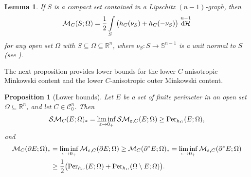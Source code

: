 \documentclass[pdflatex,sn-mathphys-num]{sn-jnl}
\theoremstyle{plain}
\newtheorem{proposition}[theorem]{Proposition}
\newtheorem{lemma}[theorem]{Lemma}
\theoremstyle{definition}
\DeclareMathOperator{\difm}{\textup{d$\mathcal{H}$}}
\begin{document}
\begin{lemma}\label{crucial}
    If $S$ is a compact set contained in a Lipschitz $(n-1)$-graph, then
    \[
        \mathcal{M}_{C}(S; \Omega)=\frac{1}{2}\int\limits_{S} \big(h_C(\nu_S)+h_C(-\nu_S)\big)\, \difm^{n-1}
    \]
    for any open set $\Omega$ with $S\subseteq\Omega\subseteq\mathbb{R}^n$, where $\nu_S\colon S\to\mathbb{S}^{n-1}$ is a unit normal to $S$ (see \cite[p. 3]{Villa2}). 
\end{lemma}
The next proposition provides lower bounds for the lower $C$-anisotropic Minkowski content and the lower $C$-anisotropic outer Minkowski content.
\begin{proposition}[Lower bounds]\label{eq:4}
Let $E$ be a set of finite perimeter in an open set $\Omega\subseteq\mathbb{R}^n$, and let $C\in\mathcal{C}^n_0$. Then
\begin{equation}
    \mathcal{SM}_{C}(E; \Omega)_*=\liminf_{\varepsilon\to 0_+} \mathcal{SM}_{\varepsilon,C}(E; \Omega) \geq \textup{Per}_{h_C}(E; \Omega),
\end{equation}
and
\begin{equation}
\begin{split}
    \mathcal{M}_{C}(\partial E; \Omega)_* &= \liminf_{\varepsilon\to 0_+} \mathcal{M}_{\varepsilon,C}(\partial E; \Omega) \geq \mathcal{M}_{C}(\partial^* E; \Omega)_* = \liminf_{\varepsilon\to 0_+} \mathcal{M}_{\varepsilon,C}(\partial^* E; \Omega)\\
    &\geq \frac{1}{2}\big(\textup{Per}_{h_C}(E; \Omega)+\textup{Per}_{h_C}(\Omega\setminus E; \Omega)\big).
\end{split}
\end{equation} 
\end{proposition}
\end{document}
